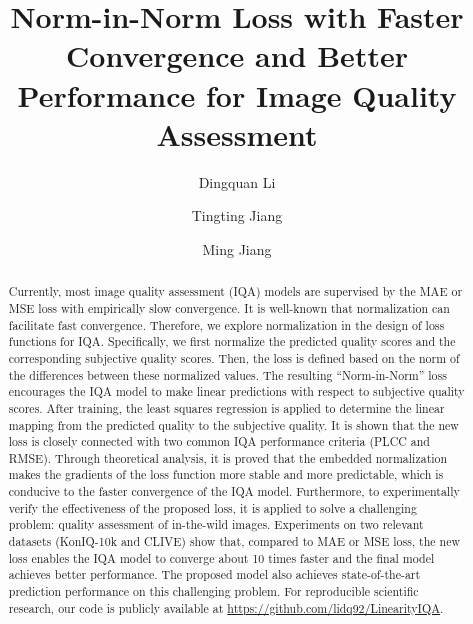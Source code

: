 \documentclass[sigconf]{acmart}
\begin{document}
\fancyhead{} 

\title[Norm-in-Norm Loss]{Norm-in-Norm Loss with Faster Convergence and Better Performance for Image Quality Assessment}

\author{Dingquan Li}

\author{Tingting Jiang}
  
\author{Ming Jiang}

\renewcommand{\shortauthors}{Li et al.}

\begin{abstract}
Currently, most image quality assessment (IQA) models are supervised by the MAE or MSE loss with empirically slow convergence.
It is well-known that normalization can facilitate fast convergence.
Therefore, we explore normalization in the design of loss functions for IQA.
Specifically, we first normalize the predicted quality scores and the corresponding subjective quality scores. 
Then, the loss is defined based on the norm of the differences between these normalized values.
The resulting ``Norm-in-Norm'' loss encourages the IQA model to make linear predictions with respect to subjective quality scores.
After training, the least squares regression is applied to determine the linear mapping from the predicted quality to the subjective quality.
It is shown that the new loss is closely connected with two common IQA performance criteria (PLCC and RMSE).
Through theoretical analysis, it is proved that the embedded normalization makes the gradients of the loss function more stable and more predictable, which is conducive to the faster convergence of the IQA model.
Furthermore, to experimentally verify the effectiveness of the proposed loss, it is applied to solve a challenging problem: quality assessment of in-the-wild images.
Experiments on two relevant datasets (KonIQ-10k and CLIVE) show that, compared to MAE or MSE loss, the new loss enables the IQA model to converge about 10 times faster and the final model achieves better performance.
The proposed model also achieves state-of-the-art prediction performance on this challenging problem.
For reproducible scientific research, our code is publicly available at \url{https://github.com/lidq92/LinearityIQA}.
\end{abstract}
\end{document}
